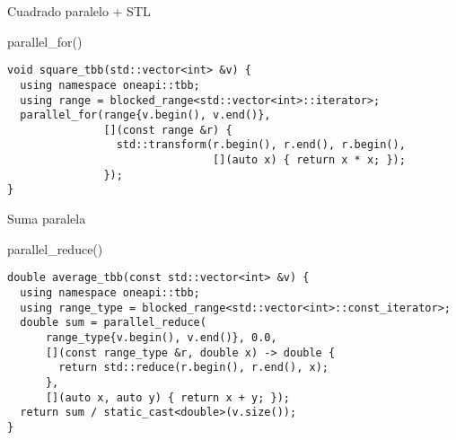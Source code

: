 \begin{frame}[t,fragile]{Cuadrado paralelo + STL}
\begin{block}{parallel\_for()}
\begin{lstlisting}
void square_tbb(std::vector<int> &v) {
  using namespace oneapi::tbb;
  using range = blocked_range<std::vector<int>::iterator>;
  parallel_for(range{v.begin(), v.end()},
               [](const range &r) {
                 std::transform(r.begin(), r.end(), r.begin(),
                                [](auto x) { return x * x; });
               });
}
\end{lstlisting}
\end{block}
\end{frame}

\begin{frame}[t,fragile]{Suma paralela}
\begin{block}{parallel\_reduce()}
\begin{lstlisting}
double average_tbb(const std::vector<int> &v) {
  using namespace oneapi::tbb;
  using range_type = blocked_range<std::vector<int>::const_iterator>;
  double sum = parallel_reduce(
      range_type{v.begin(), v.end()}, 0.0,
      [](const range_type &r, double x) -> double {
        return std::reduce(r.begin(), r.end(), x);
      },
      [](auto x, auto y) { return x + y; });
  return sum / static_cast<double>(v.size());
}
\end{lstlisting}
\end{block}
\end{frame}
